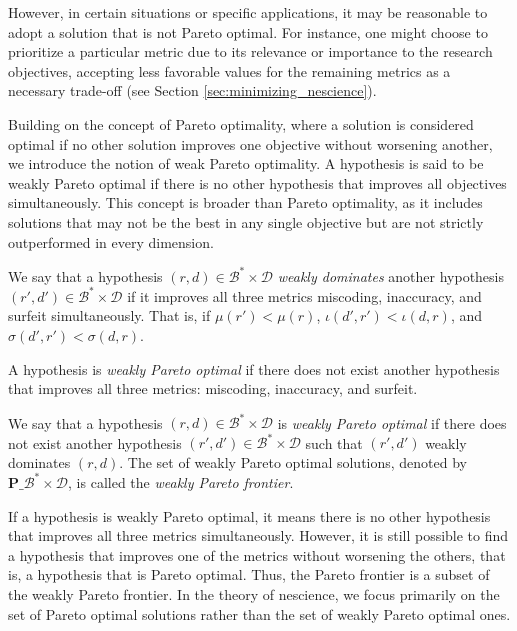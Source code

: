 However, in certain situations or specific applications, it may be reasonable to adopt a solution that is not Pareto optimal. For instance, one might choose to prioritize a particular metric due to its relevance or importance to the research objectives, accepting less favorable values for the remaining metrics as a necessary trade-off (see Section \ref{sec:minimizing_nescience}).

Building on the concept of Pareto optimality, where a solution is considered optimal if no other solution improves one objective without worsening another, we introduce the notion of weak Pareto optimality. A hypothesis is said to be weakly Pareto optimal if there is no other hypothesis that improves all objectives simultaneously. This concept is broader than Pareto optimality, as it includes solutions that may not be the best in any single objective but are not strictly outperformed in every dimension.

\begin{definition}
We say that a hypothesis $(r, d) \in \mathcal{B}^\ast \times \mathcal{D}$ \emph{weakly dominates} another hypothesis $(r', d') \in \mathcal{B}^\ast \times \mathcal{D}$ if it improves all three metrics miscoding, inaccuracy, and surfeit simultaneously. That is, if $\mu(r') < \mu(r)$, $\iota(d', r') < \iota(d, r)$, and $\sigma(d', r') < \sigma(d, r)$.
\end{definition}

A hypothesis is \emph{weakly Pareto optimal} if there does not exist another hypothesis that improves all three metrics: miscoding, inaccuracy, and surfeit.

\begin{definition}
We say that a hypothesis $(r, d) \in \mathcal{B}^\ast \times \mathcal{D}$ is \emph{weakly Pareto optimal} if there does not exist another hypothesis $(r', d') \in \mathcal{B}^\ast \times \mathcal{D}$ such that $(r', d')$ weakly dominates $(r, d)$. The set of weakly Pareto optimal solutions, denoted by $\mathbf{P}\_{\mathcal{B}^\ast \times \mathcal{D}}$, is called the \emph{weakly Pareto frontier}.
\end{definition}

If a hypothesis is weakly Pareto optimal, it means there is no other hypothesis that improves all three metrics simultaneously. However, it is still possible to find a hypothesis that improves one of the metrics without worsening the others, that is, a hypothesis that is Pareto optimal. Thus, the Pareto frontier is a subset of the weakly Pareto frontier. In the theory of nescience, we focus primarily on the set of Pareto optimal solutions rather than the set of weakly Pareto optimal ones.

